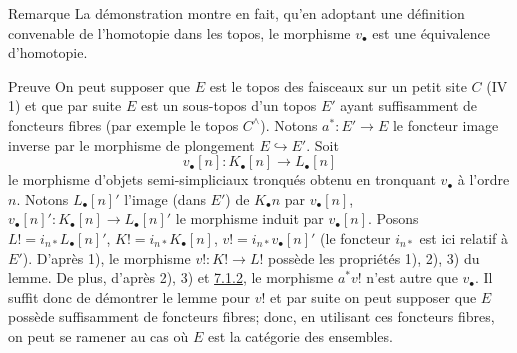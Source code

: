 \begin{enonce*}[remark]{Remarque}
La démonstration montre en fait, qu'en adoptant une définition
convenable de l'homotopie dans les topos, le morphisme $v_{∙}$ est une
équivalence d'homotopie.
\end{enonce*}

\begin{enonce*}[remark]{Preuve}
On peut supposer que $E$ est le topos des faisceaux sur un petit site
$C$ (IV 1) et que par suite $E$ est un sous-topos d'un topos $E'$
ayant suffisamment de foncteurs fibres (par exemple le topos
$C^{\wedge}$). Notons $a^\ast : E' \to E$ le foncteur
image inverse par le morphisme de plongement $E \hookrightarrow
E'$. Soit
$$
v _{∙}[n] : K _{∙}[n] \to L _{∙} [n]
$$
le morphisme d'objets semi-simpliciaux tronqués obtenu en tronquant
$v_{∙}$ à l'ordre $n$. Notons $L_{∙} [n]'$ l'image (dans $E'$)
de $K_{∙}n$ par $v_{∙}[n]$, $v_{∙}[n]' : K_{∙} [n] \to L_{∙}[n]'$
le morphisme induit par $v_{∙} [n]$. Posons $L! =
i_{n\ast} L_{∙}[n]'$, $K! = i_{n\ast} K_{∙}[n]$, $v! = i_{n\ast}
v_{∙}[n]'$ (le foncteur $i_{n\ast}$ est ici relatif à $E'$).
D'après 1), le morphisme $v! : K! \to L!$ possède les propriétés 1),
2), 3)  du lemme. De plus, d'après 2), 3) et \hyperref[V.prop7.1.2]{7.1.2}, le
morphisme $a^\ast v!$ n'est autre que $v_{∙}$. Il suffit donc de
démontrer le lemme pour $v!$ et par suite on peut supposer que $E$
possède suffisamment de foncteurs fibres; donc, en utilisant ces
foncteurs fibres, on peut se ramener au cas où $E$ est la
catégorie des ensembles.
\end{enonce*}


